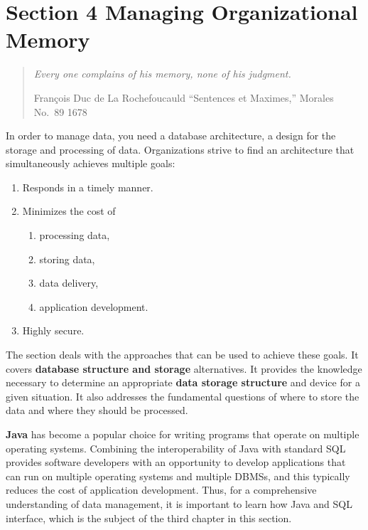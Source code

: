 \documentclass[
]{article}
\begin{document}
\hypertarget{section-4-managing-organizational-memory}{%
\section*{Section 4 Managing Organizational Memory}\label{section-4-managing-organizational-memory}}

\begin{quote}
\emph{Every one complains of his memory, none of his judgment.}

François Duc de La Rochefoucauld ``Sentences et Maximes,'' Morales No.~89 1678
\end{quote}

In order to manage data, you need a database architecture, a design for
the storage and processing of data. Organizations strive to find an
architecture that simultaneously achieves multiple goals:

\begin{enumerate}
\def\labelenumi{\arabic{enumi}.}
\item
  Responds in a timely manner.
\item
  Minimizes the cost of

  \begin{enumerate}
  \def\labelenumii{\alph{enumii}.}
  \item
    processing data,
  \item
    storing data,
  \item
    data delivery,
  \item
    application development.
  \end{enumerate}
\item
  Highly secure.
\end{enumerate}

The section deals with the approaches that can be used to achieve these
goals. It covers \textbf{database structure and storage} alternatives. It
provides the knowledge necessary to determine an appropriate \textbf{data
storage structure} and device for a given situation. It also addresses
the fundamental questions of where to store the data and where they
should be processed.

\textbf{Java} has become a popular choice for writing programs that operate
on multiple operating systems. Combining the interoperability of Java
with standard SQL provides software developers with an opportunity to
develop applications that can run on multiple operating systems and
multiple DBMSs, and this typically reduces the cost of application
development. Thus, for a comprehensive understanding of data management,
it is important to learn how Java and SQL interface, which is the
subject of the third chapter in this section.
\end{document}
